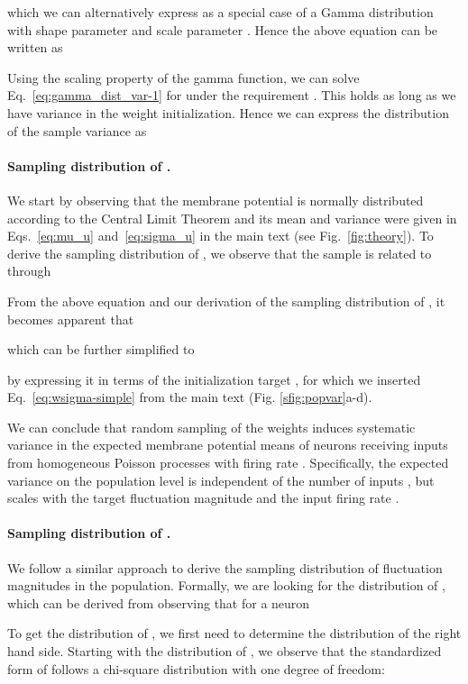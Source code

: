 \documentclass[11pt,a4paper]{article}
\begin{document}
\begin{refsection}
which we can alternatively express as a special case of a Gamma distribution  with shape parameter  and scale parameter . Hence the above equation can be written as

Using the scaling property of the gamma function, we can solve Eq.~\eqref{eq:gamma_dist_var-1} for  under the requirement . This holds as long as we have variance in the weight initialization. Hence we can express the distribution of the sample variance  as



\paragraph{Sampling distribution of .}
We start by observing that the membrane potential  is normally distributed according to the Central Limit Theorem and its mean  and variance  were given in Eqs.~\eqref{eq:mu_u} and~\eqref{eq:sigma_u} in the main text (see Fig.~\ref{fig:theory}). 
To derive the sampling distribution of , we observe that the sample  is related to  through

From the above equation and our derivation of the sampling distribution of , it becomes apparent that

which can be further simplified to 

by expressing it in terms of the initialization target , for which we inserted Eq.~\eqref{eq:wsigma-simple} from the main text (Fig. \ref{sfig:popvar}a-d).

We can conclude that random sampling of the weights induces systematic variance in the expected membrane potential means  of neurons receiving inputs from  homogeneous Poisson processes with firing rate . Specifically, the expected variance on the population level is independent of the number of inputs , but scales with the target fluctuation magnitude  and the input firing rate .


\paragraph{Sampling distribution of .}
We follow a similar approach to derive the sampling distribution of fluctuation magnitudes in the population. Formally, we are looking for the distribution of , which can be derived from observing that for a neuron 

To get the distribution of , we first need to determine the distribution of the right hand side. Starting with the distribution of , we observe that the standardized form of  follows a chi-square distribution with one degree of freedom:


\end{refsection}
\end{document}

